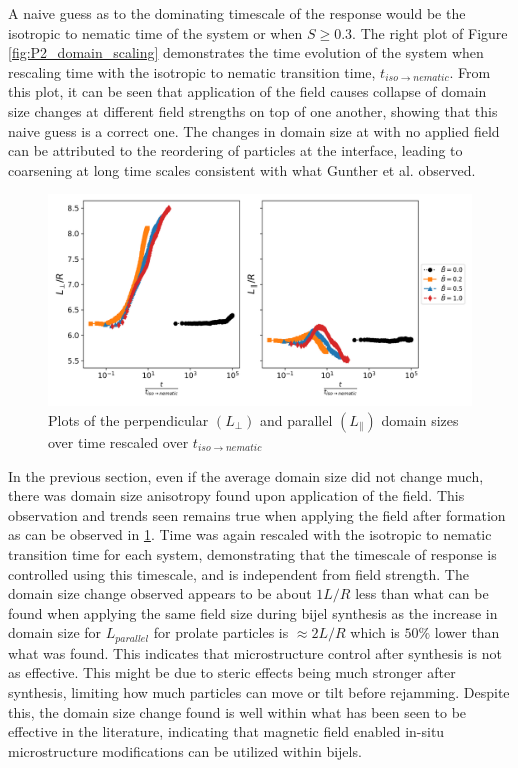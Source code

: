 A naive guess as to the dominating timescale of the response would be the isotropic to nematic time of the 
system or when $S \geq 0.3$. The right plot of Figure \ref{fig:P2_domain_scaling} demonstrates the time 
evolution of the system when rescaling time with the isotropic to nematic transition time,
 $t_{iso \rightarrow nematic}$. From this plot, it can be seen that application of the field 
 causes collapse of domain size changes at different field strengths on top of one another, 
 showing that this naive guess is a correct one. The changes in domain size at with no applied
  field can be attributed to the reordering of particles at the interface, leading to coarsening 
  at long time scales consistent with what Gunther et al. observed. \cite{gunther_timescales_2014}

\begin{figure}
    \centering
    \includegraphics[scale = 0.5]{figures/results/paper2/domain_size_aniso.png}
    \caption{Plots of the perpendicular $(L_{\perp})$ and parallel $(L_{\parallel})$ domain sizes over time rescaled over $t_{iso \rightarrow nematic}$}
    \label{fig:P2_domain_aniso}
\end{figure}

In the previous section, even if the average domain size did not change much, there was domain size anisotropy 
found upon application of the field. This observation and trends seen remains true when applying the field 
after formation as can be observed in \ref{fig:P2_domain_aniso}. Time was again rescaled with the isotropic 
to nematic transition time for each system, demonstrating that the timescale of response is controlled using 
this timescale, and is independent from field strength. The domain size change observed appears to be about $1 L/R$ 
less than what can be found when applying the same field size during bijel synthesis as the increase in domain size 
for $L_{parallel}$ for prolate particles is $\approx 2 L/R$ which is $50 \%$ lower than what was found. This 
indicates that microstructure control after synthesis is not as effective. This might be due to steric effects 
being much stronger after synthesis, limiting how much particles can move or tilt before rejamming. Despite 
this, the domain size change found is well within what has been seen to be effective in the literature, 
indicating that magnetic field enabled in-situ microstructure modifications can be utilized within bijels. 
\cite{cha_bicontinuous_2019, khan_nanostructured_2022, vanoli_bijels_2022}

